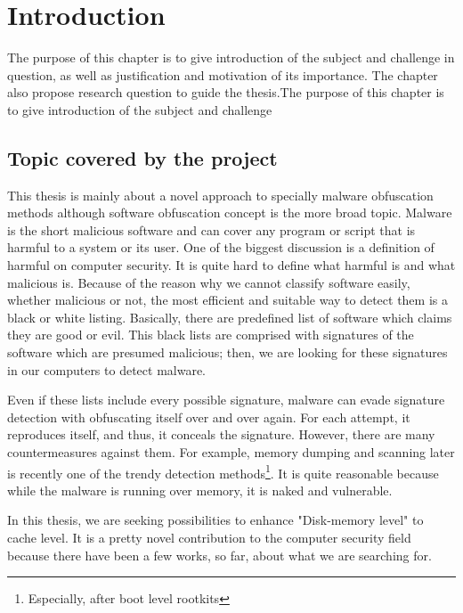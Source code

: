 \chapter{Introduction}
The purpose of this chapter is to give introduction of the subject and challenge in question, as well as justification and motivation of its importance. The chapter also propose research question to guide the thesis.The purpose of this chapter is to give introduction of the subject and challenge

\section{Topic covered by the project}
This thesis is mainly about a novel approach to specially malware obfuscation methods although software obfuscation concept is the more broad topic. Malware is the short malicious software and can cover any program or script that is harmful to a system or its user. One of the biggest discussion is a definition of harmful on computer security. It is quite hard to define what harmful is and what malicious is. Because of the reason why we cannot classify software easily, whether malicious or not, the most efficient and suitable way to detect them is a black or white listing. Basically, there are predefined list of software which claims they are good or evil. This black lists are comprised with signatures of the software which are presumed malicious; then, we are looking for these signatures in our computers to detect malware. 

Even if these lists include every possible signature, malware can evade signature detection with obfuscating itself over and over again. For each attempt, it reproduces itself, and thus, it conceals the signature. However, there are many countermeasures against them\cite{moser2007limits}\cite{egele2012survey}. For example, memory dumping and scanning later is recently one of the trendy detection methods\footnote{Especially, after boot level rootkits}. It is quite reasonable because while the malware is running over memory, it is naked and vulnerable.

In this thesis, we are seeking possibilities to enhance "Disk-memory level" to cache level. It is a pretty novel contribution to the computer security field because there have been a few works, so far, about what we are searching for.


